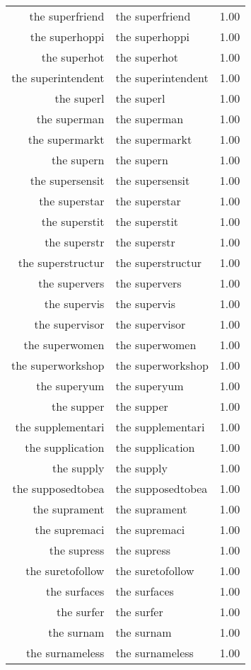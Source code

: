 \begin{table}[ht]
\begin{tabular}{rlr}
  the superfriend & the superfriend & 1.00 \\ 
  the superhoppi & the superhoppi & 1.00 \\ 
  the superhot & the superhot & 1.00 \\ 
  the superintendent & the superintendent & 1.00 \\ 
  the superl & the superl & 1.00 \\ 
  the superman & the superman & 1.00 \\ 
  the supermarkt & the supermarkt & 1.00 \\ 
  the supern & the supern & 1.00 \\ 
  the supersensit & the supersensit & 1.00 \\ 
  the superstar & the superstar & 1.00 \\ 
  the superstit & the superstit & 1.00 \\ 
  the superstr & the superstr & 1.00 \\ 
  the superstructur & the superstructur & 1.00 \\ 
  the supervers & the supervers & 1.00 \\ 
  the supervis & the supervis & 1.00 \\ 
  the supervisor & the supervisor & 1.00 \\ 
  the superwomen & the superwomen & 1.00 \\ 
  the superworkshop & the superworkshop & 1.00 \\ 
  the superyum & the superyum & 1.00 \\ 
  the supper & the supper & 1.00 \\ 
  the supplementari & the supplementari & 1.00 \\ 
  the supplication & the supplication & 1.00 \\ 
  the supply & the supply & 1.00 \\ 
  the supposedtobea & the supposedtobea & 1.00 \\ 
  the suprament & the suprament & 1.00 \\ 
  the supremaci & the supremaci & 1.00 \\ 
  the supress & the supress & 1.00 \\ 
  the suretofollow & the suretofollow & 1.00 \\ 
  the surfaces & the surfaces & 1.00 \\ 
  the surfer & the surfer & 1.00 \\ 
  the surnam & the surnam & 1.00 \\ 
  the surnameless & the surnameless & 1.00 \\ 

\end{tabular}
\end{table}
